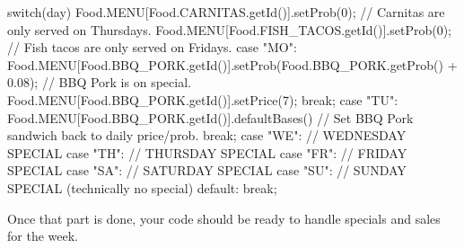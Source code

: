 \documentclass[11pt]{article}
\begin{document}
\begin{java}
switch(day)
{
Food.MENU[Food.CARNITAS.getId()].setProb(0); // Carnitas are only served on Thursdays.
Food.MENU[Food.FISH_TACOS.getId()].setProb(0); // Fish tacos are only served on Fridays.
case "MO":
  Food.MENU[Food.BBQ_PORK.getId()].setProb(Food.BBQ_PORK.getProb() + 0.08); // BBQ Pork is on special.
  Food.MENU[Food.BBQ_PORK.getId()].setPrice(7);
  break;
case "TU":
  Food.MENU[Food.BBQ_PORK.getId()].defaultBases() // Set BBQ Pork sandwich back to daily price/prob.
  break;
case "WE":
  // WEDNESDAY SPECIAL
case "TH":
  // THURSDAY SPECIAL
case "FR":
  // FRIDAY SPECIAL
case "SA":
  // SATURDAY SPECIAL
case "SU":
  // SUNDAY SPECIAL (technically no special)
default: break;
}
\end{java}
Once that part is done, your code should be ready to handle specials and sales for the week.
\end{document}

